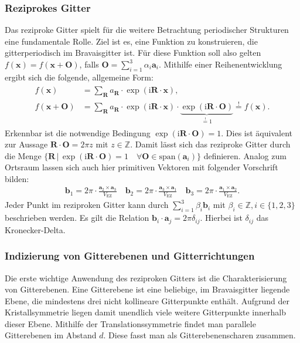 \subsubsection{Reziprokes Gitter}
Das reziproke Gitter spielt für die weitere Betrachtung periodischer Strukturen eine fundamentale Rolle.
Ziel ist es, eine Funktion zu konstruieren, die gitterperiodisch im Bravaisgitter ist.
Für diese Funktion soll also gelten
$f(\mathbf{x})=f(\mathbf{x}+\mathbf{O})$, falls $\mathbf{O}=\sum_{i=1}^{3} \alpha_{i}\mathbf{a}_{i}$.
Mithilfe einer Reihenentwicklung ergibt sich die folgende, allgemeine Form:
\begin{align}
    \begin{split}
        f(\mathbf{x})&=\sum_{\mathbf{R}}a_{\mathbf{R}}\cdot \exp(\mathrm{i}\mathbf{R}\cdot\mathbf{x}),\\
        f(\mathbf{x}+\mathbf{O})&=\sum_{\mathbf{R}}a_{\mathbf{R}}\cdot \exp(\mathrm{i}\mathbf{R}\cdot \mathbf{x})\cdot
        \underbrace{ \exp(\mathrm{i}\mathbf{R}\cdot \mathbf{O}) }_{ \stackrel{!}{=}1 }  \stackrel{!}{=} f(\mathbf{x}).
    \end{split}
\end{align}
Erkennbar ist die notwendige Bedingung $\exp(\mathrm{i}\mathbf{R}\cdot \mathbf{O})=1$.
Dies ist äquivalent zur Aussage $\mathbf{R}\cdot \mathbf{O}=2\pi z$ mit $z \in \mathbb{Z}$.
Damit lässt sich das reziproke Gitter durch die Menge
$\{ \mathbf{R} \,\vert\, \exp(\mathrm{i}\mathbf{R}\cdot \mathbf{O})=1 \quad
\forall \mathbf{O} \in \text{span}(\mathbf{a}_{i}) \}$ definieren. \autocite[108]{Ashcroft}
Analog zum Ortsraum lassen sich auch hier primitiven Vektoren mit folgender Vorschrift bilden:
\begin{align*}
    \mathbf{b}_{1} = 2\pi \cdot \frac{\mathbf{a}_{2} \times \mathbf{a}_{3}}{V_{\mathrm{EZ}}} \quad
    \mathbf{b}_{2} = 2\pi \cdot \frac{\mathbf{a}_{3} \times \mathbf{a}_{1}}{V_{\mathrm{EZ}}} \quad
    \mathbf{b}_{3} = 2\pi \cdot \frac{\mathbf{a}_{1} \times \mathbf{a}_{2}}{V_{\mathrm{EZ}}}.
\end{align*}
Jeder Punkt im reziproken Gitter kann durch $\sum_{i=1}^{3} \beta_{i}\mathbf{b}_{i}$ mit $\beta_i \in \mathbb{Z},
i\in\{1,2,3\}$ beschrieben werden.
Es gilt die Relation $\mathbf{b}_{i}\cdot \mathbf{a}_{j}=2 \pi \delta_{ij}$.
Hierbei ist $\delta_{ij}$ das Kronecker-Delta.
\autocite[109]{Ashcroft}

\subsubsection{Indizierung von Gitterebenen und Gitterrichtungen}\label{subsubsec:indizierung}
Die erste wichtige Anwendung des reziproken Gitters ist die Charakterisierung von Gitterebenen.
Eine Gitterebene ist eine beliebige, im Bravaisgitter liegende Ebene, die mindestens drei nicht kollineare Gitterpunkte
enthält.
Aufgrund der Kristallsymmetrie liegen damit unendlich viele weitere Gitterpunkte innerhalb dieser Ebene.
Mithilfe der Translationssymmetrie findet man parallele Gitterebenen im Abstand $d$.
Diese fasst man als Gitterebenenscharen zusammen. \autocite[113]{Ashcroft}

